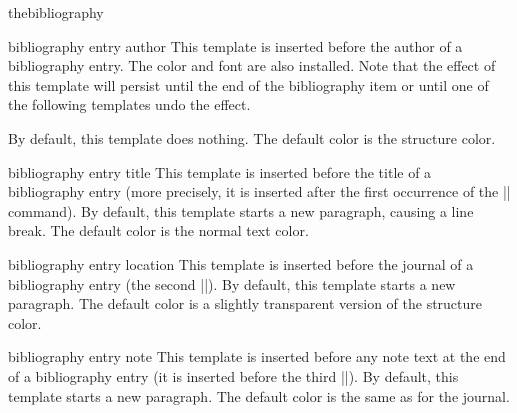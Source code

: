 \begin{environment}{{thebibliography}}
  \begin{element}{bibliography entry author}\yes\yes\yes
    This template is inserted before the author of a bibliography entry. The color and font are also installed. Note that the effect of this template will persist until the end of the bibliography item or until one of the following templates undo the effect.

    By default, this template does nothing. The default color is the structure color.
  \end{element}

  \begin{element}{bibliography entry title}\yes\yes\yes
    This template is inserted before the title of a bibliography entry (more precisely, it is inserted after the first occurrence of the |\newblock| command). By default, this template starts a new paragraph, causing a line break. The default color is the normal text color.
  \end{element}

  \begin{element}{bibliography entry location}\yes\yes\yes
    This template is inserted before the journal of a bibliography entry (the second |\newblock|). By default, this template starts a new paragraph. The default color is a slightly transparent version of the structure color.
  \end{element}

  \begin{element}{bibliography entry note}\yes\yes\yes
    This template is inserted before any note text at the end of a bibliography entry (it is inserted before the third |\newblock|). By default, this template starts a new paragraph. The default color is the same as for the journal.
  \end{element}
\end{environment}

